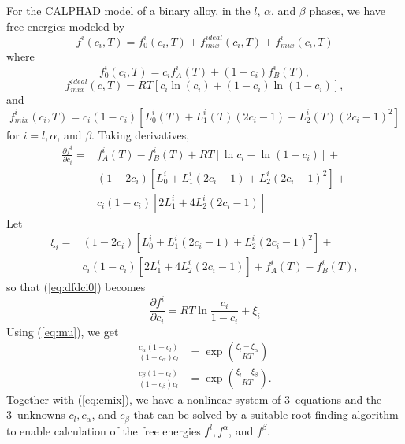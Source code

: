 For the CALPHAD model of a binary alloy, in the $l$, $\alpha$, and
$\beta$ phases, we have free energies modeled by
%
\begin{equation}
  f^i(c_i,T) = f_0^i(c_i,T) + f_\mathit{mix}^\mathit{ideal}(c_i,T) +
    f^i_\mathit{mix}(c_i,T)
\end{equation}
%
where
%
\begin{equation}
  f_0^i(c_i,T) = c_i f_A^i(T) + (1 - c_i) f_B^i(T),
\end{equation}
%
\begin{equation}
  f_\mathit{mix}^\mathit{ideal}(c,T)  =
    R T [ c_i \ln(c_i ) + (1 - c_i) \ln(1 - c_i ) ],
\end{equation}
%
and
%
\begin{equation}
  f^i_\mathit{mix}(c_i,T) = c_i (1 - c_i)
    [ L_0^i(T) + L_1^i(T) (2 c_i - 1) +
      L_2^i(T) (2 c_i - 1)^2 ]
\end{equation}
%
for $i = l, \alpha$, and $\beta$.
Taking derivatives,
%
\begin{equation}
\begin{split}
  \frac{\partial f^i}{\partial c_i} = {} &
    f_A^i(T) - f_B^i(T) +
    RT \left[ \ln c_i - \ln ( 1 - c_i ) \right] +
    \\ &
    ( 1 - 2 c_i ) \left[ L_0^i + L_1^i ( 2 c_i - 1 ) +
      L_2^i ( 2 c_i - 1 )^2 \right] +
    \\ &
    c_i ( 1 - c_i ) \left[ 2 L_1^i +
      4 L_2^i ( 2 c_i - 1 ) \right]
\label{eq:dfdci0}
\end{split}
\end{equation}
%
Let
%
\begin{equation}
\begin{split}
  \xi_i = {} &
  ( 1 - 2 c_i ) \left[ L_0^i + L_1^i ( 2 c_i - 1 ) +
    L_2^i ( 2 c_i - 1 )^2 \right] +
  \\ &
    c_i ( 1 - c_i ) \left[ 2 L_1^i +
      4 L_2^i ( 2 c_i - 1 ) \right] +
    f_A^i(T) - f_B^i(T),
\end{split}
\end{equation}
%
so that (\ref{eq:dfdci0}) becomes
%
\begin{equation}
  \frac{\partial f^i}{\partial c_i} = 
    RT \ln \frac{c_i}{1 - c_i} + \xi_i
\label{eq:dfdci}
\end{equation}
%
Using (\ref{eq:mu}), we get
%
\begin{align}
  \frac{ c_\alpha (1 - c_l) }{ (1 - c_\alpha) c_l } &=
    \exp \left( \frac{ \xi_l - \xi_\alpha }{ RT } \right) \\
  \frac{ c_\beta (1 - c_l) }{ (1 - c_\beta) c_l } &=
    \exp \left( \frac{ \xi_l - \xi_\beta }{ RT } \right).
\end{align}
%
Together with (\ref{eq:cmix}), we have a nonlinear system of
3~equations and the 3~unknowns $c_l, c_\alpha$, and $c_\beta$
that can be solved by a suitable root-finding algorithm to enable
calculation of the free energies $f^l, f^\alpha$, and $f^\beta$.
    
